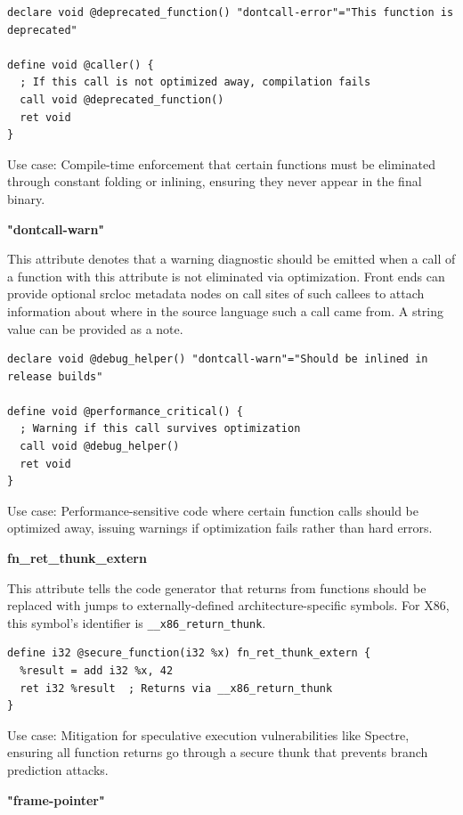 \begin{lstlisting}[style=ir]
declare void @deprecated_function() "dontcall-error"="This function is deprecated"

define void @caller() {
  ; If this call is not optimized away, compilation fails
  call void @deprecated_function()
  ret void
}
\end{lstlisting}

Use case: Compile-time enforcement that certain functions must be eliminated through constant folding or inlining, ensuring they never appear in the final binary.

\textbf{"dontcall-warn"}

This attribute denotes that a warning diagnostic should be emitted when a call of a function with this attribute is not eliminated via optimization.
Front ends can provide optional srcloc metadata nodes on call sites of such callees to attach information about where in the source language such a call came from.
A string value can be provided as a note.

\begin{lstlisting}[style=ir]
declare void @debug_helper() "dontcall-warn"="Should be inlined in release builds"

define void @performance_critical() {
  ; Warning if this call survives optimization
  call void @debug_helper()
  ret void
}
\end{lstlisting}

Use case: Performance-sensitive code where certain function calls should be optimized away, issuing warnings if optimization fails rather than hard errors.

\textbf{fn\_ret\_thunk\_extern}

This attribute tells the code generator that returns from functions should be replaced with jumps to externally-defined architecture-specific symbols.
For X86, this symbol's identifier is \texttt{\_\_x86\_return\_thunk}.

\begin{lstlisting}[style=ir]
define i32 @secure_function(i32 %x) fn_ret_thunk_extern {
  %result = add i32 %x, 42
  ret i32 %result  ; Returns via __x86_return_thunk
}
\end{lstlisting}

Use case: Mitigation for speculative execution vulnerabilities like Spectre, ensuring all function returns go through a secure thunk that prevents branch prediction attacks.

\textbf{"frame-pointer"}

